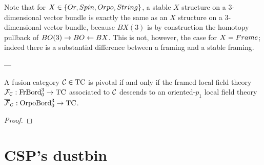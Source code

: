 \documentclass{amsart}
\begin{document}
\nid Note that for $X \in \{Or, Spin, Orpo, String\}$, a stable $X$ structure on a 3-dimensional vector bundle is exactly the same as an $X$ structure on a 3-dimensional vector bundle, because $BX(3)$ is by construction the homotopy pullback of $BO(3) \rightarrow BO \leftarrow BX$.  This is not, however, the case for $X = Frame$; indeed there is a substantial difference between a framing and a stable framing.



---
\begin{theorem} \label{thm-pivorpo}
A fusion category $\mathcal C \in \mathrm{TC}$ is pivotal if and only if the framed local field theory $\mathcal F_{\mathcal C} : \mathrm{FrBord}_0^3 \rightarrow \mathrm{TC}$ associated to $\mathcal C$ descends to an oriented-$p_1$ local field theory $\overline{\mathcal F}_{\mathcal C} : \mathrm{OrpoBord}_0^3 \rightarrow \mathrm{TC}$.
\end{theorem}

\begin{proof}

\end{proof}



\section{CSP's dustbin}
\end{document}
